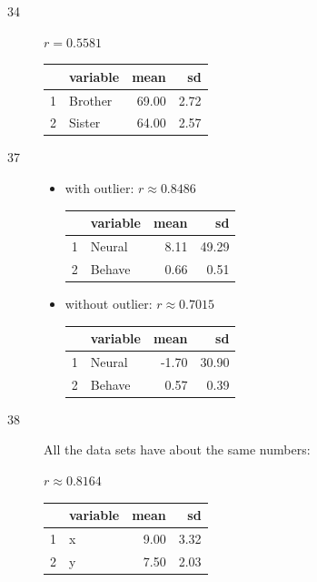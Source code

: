 \documentclass[letterpaper]{exam}
\begin{document}
    \begin{description}
      \item[34] $r = 0.5581$

        \begin{tabular}{rlrr}
          \toprule
            & variable & mean & sd \\
          \midrule
          1 & Brother & 69.00 & 2.72 \\
          2 & Sister  & 64.00 & 2.57 \\
          \bottomrule
        \end{tabular}

      \item[37]
        \begin{itemize}
          \item with outlier: $r \approx 0.8486$

            \begin{tabular}{rlrr}
              \toprule
                & variable & mean & sd \\
              \midrule
              1 & Neural   & 8.11 & 49.29 \\
              2 & Behave   & 0.66 & 0.51 \\
              \bottomrule
            \end{tabular}

          \item without outlier: $r \approx 0.7015$

            \begin{tabular}{rlrr}
              \toprule
                 & variable & mean  & sd \\
              \midrule
              1  & Neural   & -1.70 & 30.90 \\
              2  & Behave   & 0.57  & 0.39 \\
              \bottomrule
            \end{tabular}

        \end{itemize}

      \item[38]
        All the data sets have about the same numbers:

        $r \approx 0.8164$

        \begin{tabular}{rlrr}
          \toprule
             & variable & mean & sd \\
          \midrule
          1  & x        & 9.00 & 3.32 \\
          2  & y        & 7.50 & 2.03 \\
          \bottomrule
        \end{tabular}


\end{description}
\end{document}
